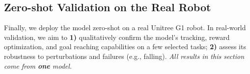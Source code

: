 


\subsection{Zero-shot Validation on the Real Robot}

Finally, we deploy the \method{} model zero-shot on a real Unitree G1 robot. In real-world validation, we aim to \textbf{1)} qualitatively confirm the model's tracking, reward optimization, and goal reaching capabilities on a few selected tasks; \textbf{2)} assess its robustness to perturbations and failures (e.g., falling). \emph{All results in this section come from \textbf{one} model.}



